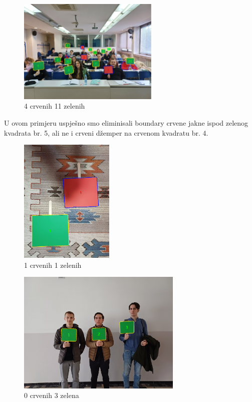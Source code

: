 \documentclass[a4paper,12pt]{article}
\begin{document}
\begin{figure}[htbp]
    \centering
    \includegraphics[width=0.6\textwidth]{img/studenti2.png}
    \caption{4 crvenih 11 zelenih}
    \label{fig:example}
\end{figure}
U ovom primjeru uspješno smo eliminisali boundary crvene jakne ispod zelenog kvadrata br. 5, ali ne i crveni džemper na crvenom kvadratu br. 4.
\begin{figure}[htbp]
    \centering
    \includegraphics[width=0.4\textwidth]{img/kvadrati_test.png}
    \caption{1 crvenih 1 zelenih}
    \label{fig:example}
\end{figure}
\begin{figure}[htbp]
    \centering
    \includegraphics[width=0.7\textwidth]{img/kolege_1_crop.png}
    \caption{0 crvenih 3 zelena}
    \label{fig:example}
\end{figure}
\end{document}
